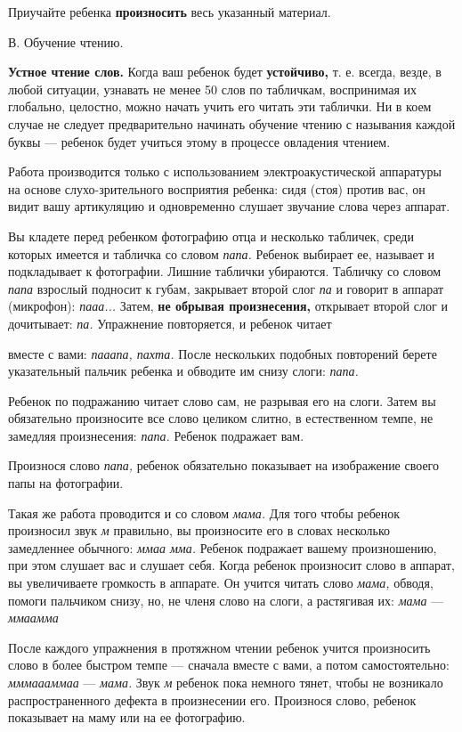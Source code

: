 \documentclass[a5paper]{book}
\renewcommand{\emph}[1]{\textit{#1}}
\begin{document}
Приучайте ребенка \textbf{произносить} весь указанный материал.

В. Обучение чтению.

\textbf{Устное чтение слов.} Когда ваш ребенок будет \textbf{устойчиво,}
т. е. всегда, везде, в любой ситуации, узнавать не менее 50 слов по
табличкам, воспринимая их глобально, целостно, можно начать учить его
читать эти таблички. Ни в коем случае не следует предварительно начинать
обучение чтению с называния каждой буквы --- ребенок будет учиться этому
в процессе овладения чтением.

Работа производится только с использованием электроакустической
аппаратуры на основе слухо-зрительного восприятия ребенка: сидя (стоя)
против вас, он видит вашу артикуляцию и одновременно слушает звучание
слова через аппарат.

Вы кладете перед ребенком фотографию отца и несколько табличек, среди
которых имеется и табличка со словом \emph{папа.} Ребенок выбирает ее,
называет и подкладывает к фотографии. Лишние таблички убираются.
Табличку со словом \emph{папа} взрослый подносит к губам, закрывает
второй слог \emph{па} и говорит в аппарат (микрофон): \emph{пааа...}
Затем, \textbf{не обрывая произнесения,} открывает второй слог и
дочитывает: \emph{па.} Упражнение повторяется, и ребенок читает

вместе с вами: \emph{пааапа, пахта.} После нескольких подобных
повторений берете указательный пальчик ребенка и обводите им снизу
слоги: \emph{папа.}

Ребенок по подражанию читает слово сам, не разрывая его на слоги. Затем
вы обязательно произносите все слово целиком слитно, в естественном
темпе, не замедляя произнесения: \emph{папа.} Ребенок подражает вам.

Произнося слово \emph{папа,} ребенок обязательно показывает на
изображение своего папы на фотографии.

Такая же работа проводится и со словом \emph{мама.} Для того чтобы
ребенок произносил звук \emph{м} правильно, вы произносите его в словах
несколько замедленнее обычного: \emph{ммаа мма.} Ребенок подражает
вашему произношению, при этом слушает вас и слушает себя. Когда ребенок
произносит слово в аппарат, вы увеличиваете громкость в аппарате. Он
учится читать слово \emph{мама,} обводя, помоги пальчиком снизу, но, не
членя слово на слоги, а растягивая их: \emph{мама} --- \emph{ммаамма}

После каждого упражнения в протяжном чтении ребенок учится произносить
слово в более быстром темпе --- сначала вместе с вами, а потом
самостоятельно: \emph{мммаааммаа} --- \emph{мама.} Звук \emph{м} ребенок
пока немного тянет, чтобы не возникало распространенного дефекта в
произнесении его. Произнося слово, ребенок показывает на маму или на ее
фотографию.
\end{document}
